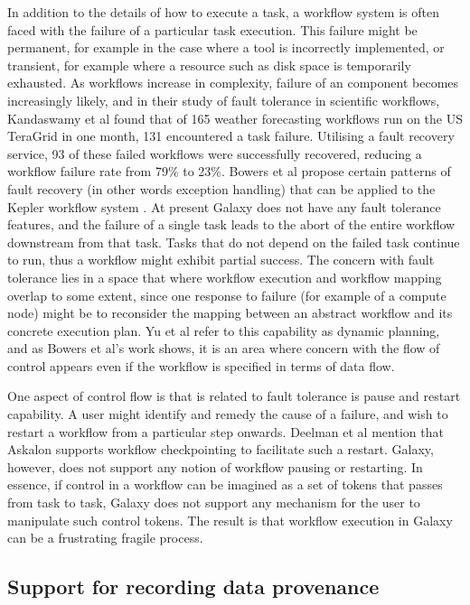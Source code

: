 \documentclass[a4paper,10pt]{scrreprt} \usepackage[utf8]{inputenc}
\begin{document}
In addition to the details of how to execute a task, a workflow system is often faced with the failure of a particular task execution. This failure might be permanent, for example in the case where a tool is incorrectly implemented, or transient, for example where a resource such as disk space is temporarily exhausted. As workflows increase in complexity, failure of an component becomes increasingly likely, and in their study of fault tolerance in scientific workflows, Kandaswamy et al \cite{kandaswamy_fault_2008} found that of 165 weather forecasting workflows run on the US TeraGrid in one month, 131 encountered a task failure. Utilising a fault recovery service, 93 of these failed workflows were successfully recovered, reducing a workflow failure rate from 79\% to 23\%. Bowers et al propose certain patterns of fault recovery (in other words exception handling) that can be applied to the Kepler workflow system \cite{bowers_enabling_2006}. At present Galaxy does not have any fault tolerance features, and the 
failure of a single task leads to the abort of the entire workflow downstream from that task. Tasks that do not depend on the failed task continue to run, thus a workflow might exhibit partial success. The concern with fault tolerance lies in a space that where workflow execution and workflow mapping overlap to some extent, since one response to failure (for example of a compute node) might be to reconsider the mapping between an abstract workflow and its concrete execution plan. Yu et al refer to this capability as dynamic planning, and as Bowers et al's work shows, it is an area where concern with the flow of control appears even if the workflow is specified in terms of data flow.

One aspect of control flow is that is related to fault tolerance is pause and restart capability. A user might identify and remedy the cause of a failure, and wish to restart a workflow from a particular step onwards. Deelman et al mention that Askalon supports workflow checkpointing to facilitate such a restart. Galaxy, however, does not support any notion of workflow pausing or restarting. In essence, if control in a workflow can be imagined as a set of tokens that passes from task to task, Galaxy does not support any mechanism for the user to manipulate such control tokens. The result is that workflow execution in Galaxy can be a frustrating fragile process.

\subsection{Support for recording data provenance}
\end{document}
